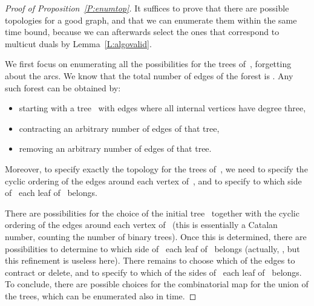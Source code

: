 \documentclass[11pt]{article}
\theoremstyle{plain}  \newtheorem{theorem}{Theorem}[section]
\theoremstyle{definition}
\begin{document}
\begin{proof}[Proof of Proposition~\ref{P:enumtop}]
  It suffices to prove that there are  possible
  topologies for a good graph, and that we can enumerate them within the
  same time bound, because we can afterwards select the ones that
  correspond to multicut duals by Lemma~\ref{L:algovalid}.

  We first focus on enumerating all the possibilities for the trees
  of~, forgetting about the arcs.  We know that the total number of
  edges of the forest is .  Any such forest can be obtained by:
  \begin{itemize}
  \item starting with a tree~ with  edges where all internal
    vertices have degree three,
  \item contracting an arbitrary number of edges of that tree,
  \item removing an arbitrary number of edges of that tree.
  \end{itemize}
  Moreover, to specify exactly the topology for the trees of~, we need
  to specify the cyclic ordering of the edges around each vertex of~,
  and to specify to which side of~ each leaf of~ belongs.

  There are  possibilities for the choice of the initial
  tree~ together with the cyclic ordering of the edges around each
  vertex of~ (this is essentially a Catalan number, counting the
  number of binary trees).  Once this is determined, there are
   possibilities to determine to which side of~ each
  leaf of~ belongs (actually, , but this refinement is
  useless here).  There remains to choose which of the  edges to
  contract or delete, and to specify to which of the  sides
  of~ each leaf of~ belongs.  To conclude, there are
   possible choices for the combinatorial map for the union
  of the trees, which can be enumerated also in  time.


\end{proof}
\end{document}
